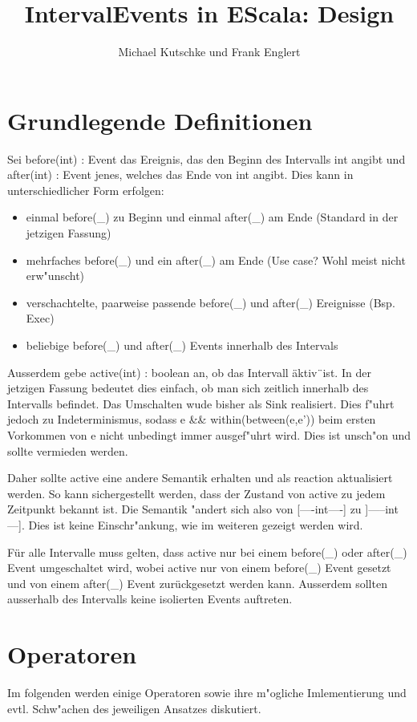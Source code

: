 \documentclass[article,colorback,accentcolor=tud4c]{tudreport}
\title{IntervalEvents in EScala: Design}
\subtitle{Michael Kutschke und Frank Englert}
\begin{document}
\maketitle

\tableofcontents

\section{Grundlegende Definitionen}
Sei before(int) : Event das Ereignis, das den Beginn des Intervalls int angibt und after(int) : Event jenes, welches das Ende von int angibt. Dies kann in unterschiedlicher Form erfolgen:
\begin{itemize}
\item einmal before(\_) zu Beginn und einmal after(\_) am Ende (Standard in der jetzigen Fassung)
\item mehrfaches before(\_) und ein after(\_) am Ende (Use case? Wohl meist nicht erw"unscht)
\item verschachtelte, paarweise passende before(\_) und after(\_) Ereignisse (Bsp. Exec)
\item beliebige before(\_) und after(\_) Events innerhalb des Intervals
\end{itemize}
Ausserdem gebe active(int) : boolean an, ob das Intervall \"aktiv\"\  ist. In der jetzigen Fassung bedeutet dies einfach, ob man sich zeitlich innerhalb des Intervalls befindet. Das Umschalten wude bisher als Sink realisiert. Dies f"uhrt jedoch zu Indeterminismus, sodass e \&\& within(between(e,e')) beim ersten Vorkommen von e nicht unbedingt immer ausgef"uhrt wird. Dies ist unsch"on und sollte vermieden werden.

Daher sollte active eine andere Semantik erhalten und als reaction aktualisiert werden. So kann sichergestellt werden, dass der Zustand von active zu jedem Zeitpunkt bekannt ist. Die Semantik "andert sich also von [----int----] zu ]-----int---]. Dies ist keine Einschr"ankung, wie im weiteren gezeigt werden wird.

Für alle Intervalle muss gelten, dass active nur bei einem before(\_) oder after(\_) Event umgeschaltet wird, wobei active nur von einem before(\_) Event gesetzt und von einem after(\_) Event zurückgesetzt werden kann. Ausserdem sollten ausserhalb des Intervalls keine isolierten Events auftreten.

\section{Operatoren}
Im folgenden werden einige Operatoren sowie ihre m"ogliche Imlementierung und evtl. Schw"achen des jeweiligen Ansatzes diskutiert.
\end{document}
